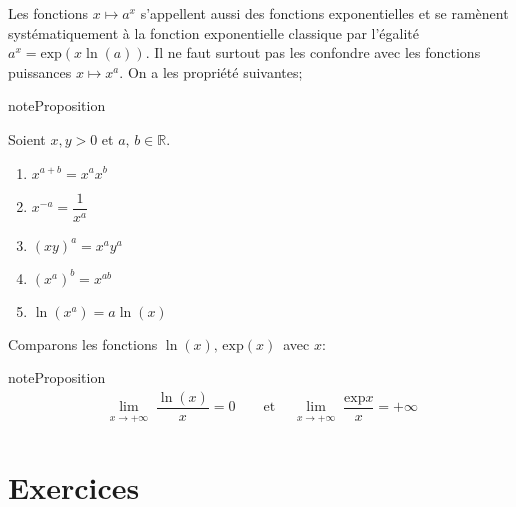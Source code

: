 \documentclass[letterpaper,10pt,french]{jupyterBook}
\begin{document}
\sphinxAtStartPar
Les fonctions \(x\mapsto a^x\) s’appellent aussi des fonctions exponentielles et se ramènent systématiquement à la fonction exponentielle classique par l’égalité \(a^x=\mbox{exp}(x\ln (a)).\) Il ne faut surtout pas les confondre avec les fonctions puissances \(x\mapsto x^a.\) On a les propriété suivantes;

\begin{sphinxadmonition}{note}{Proposition}

\sphinxAtStartPar
Soient \(x,y>0\) et \(a,\,b\in \mathbb{R}.\)
\begin{enumerate}
%
\item {} 
\sphinxAtStartPar
\(x^{a+b}=x^a x^b\)

\item {} 
\sphinxAtStartPar
\(x^{-a}=\dfrac{1}{x^a}\)

\item {} 
\sphinxAtStartPar
\((xy)^a=x^a y^a\)

\item {} 
\sphinxAtStartPar
\((x^a)^b=x^{ab}\)

\item {} 
\sphinxAtStartPar
\(\ln(x^a)=a\ln (x)\)

\end{enumerate}
\end{sphinxadmonition}

\sphinxAtStartPar
Comparons les fonctions \(\ln (x),\,\mbox{exp}(x)\,\) avec \(x:\)

\begin{sphinxadmonition}{note}{Proposition}
\begin{equation*}
\begin{split}
\lim\limits_{\substack{x\rightarrow+\infty}}\dfrac{\ln (x)}{x}=0\qquad \mbox{et}\quad \lim\limits_{\substack{x\rightarrow+\infty}}\dfrac{\mbox{exp}x}{x}=+\infty
\end{split}
\end{equation*}\end{sphinxadmonition}


\section{Exercices}
\label{\detokenize{exo3:exercices}}\label{\detokenize{exo3::doc}}
\end{document}

